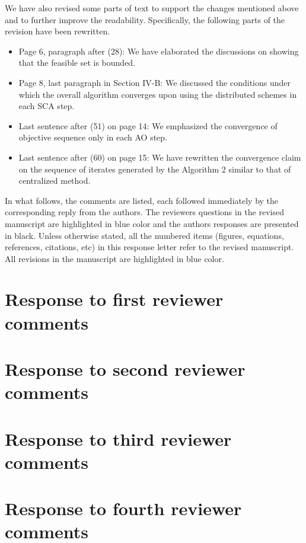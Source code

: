\documentclass[10pt,letterpaper,onecolumn]{article}
\begin{document}
	
	We have  also revised some parts of text to support the changes mentioned above and to further improve the readability. Specifically, the following parts of the revision have been rewritten.
	\begin{itemize}
		\item Page 6, paragraph after (28): We have elaborated the discussions on showing that the feasible set is bounded.
		\item Page 8, last paragraph in Section IV-B: We discussed the conditions under which the overall algorithm converges upon using the distributed schemes in each \ac{SCA} step.
		\item Last sentence after (51) on page 14: We emphasized the convergence of objective sequence only in each \ac{AO} step. 
		\item Last sentence after (60) on page 15: We have rewritten the convergence claim on the sequence of iterates generated by the Algorithm 2 similar to that of centralized method.
	\end{itemize}
	
	\vspace{1eM}
	In what follows, the comments are listed, each followed immediately by the corresponding reply from the authors. The reviewers questions in the revised manuscript are highlighted in blue color and the authors responses are presented in black. Unless otherwise stated, all the numbered items (figures, equations, references, citations, etc) in this response letter refer to the revised manuscript. All revisions in the manuscript are highlighted in blue color.
	\newpage
	\section*{Response to first reviewer comments}
	
	
	\newpage
	\section*{Response to second reviewer comments}
	
	
	\newpage
	\section*{Response to third reviewer comments}
	
	
	\newpage
	\section*{Response to fourth reviewer comments}
	
	
\end{document}
